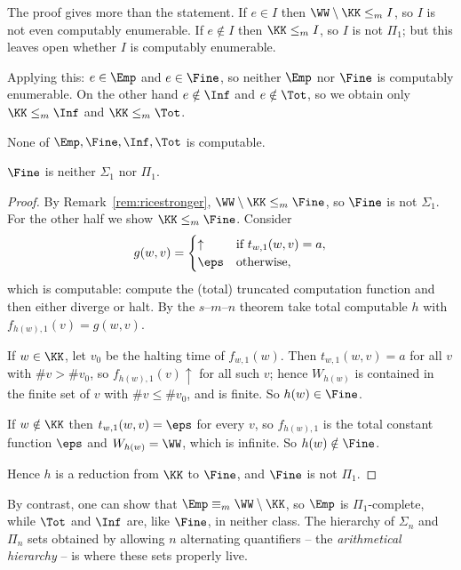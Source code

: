 \begin{remark}\label{rem:ricestronger}
	The proof gives more than the statement. If $e \in I$ then $\WW\setminus\KK \leq_m I$, so $I$ is not even computably enumerable. If $e \notin I$ then $\KK \leq_m I$, so $I$ is not $\Pi_1$; but this leaves open whether $I$ is computably enumerable.

	Applying this: $e \in \Emp$ and $e \in \Fine$, so neither $\Emp$ nor $\Fine$ is computably enumerable. On the other hand $e \notin\Inf$ and $e\notin\Tot$, so we obtain only $\KK\leq_m\Inf$ and $\KK\leq_m\Tot$.
\end{remark}

\begin{corollary}
	None of $\Emp, \Fine, \Inf, \Tot$ is computable.
\end{corollary}

\begin{theorem}
	$\Fine$ is neither $\Sigma_1$ nor $\Pi_1$.
\end{theorem}

\begin{proof}
	By Remark~\ref{rem:ricestronger}, $\WW\setminus\KK\leq_m\Fine$, so $\Fine$ is not $\Sigma_1$. For the other half we show $\KK\leq_m\Fine$. Consider
	$$g(w,v) = \begin{cases}\uparrow & \text{if } t_{w,1}(w,v) = a, \\ \eps & \text{otherwise},\end{cases}$$
	which is computable: compute the (total) truncated computation function and then either diverge or halt. By the $s$--$m$--$n$ theorem take total computable $h$ with $f_{h(w),1}(v) = g(w,v)$.

	If $w \in \KK$, let $v_0$ be the halting time of $f_{w,1}(w)$. Then $t_{w,1}(w,v) = a$ for all $v$ with $\#v > \#v_0$, so $f_{h(w),1}(v)\!\uparrow$ for all such $v$; hence $W_{h(w)}$ is contained in the finite set of $v$ with $\#v \leq \#v_0$, and is finite. So $h(w)\in\Fine$.

	If $w \notin\KK$ then $t_{w,1}(w,v) = \eps$ for every $v$, so $f_{h(w),1}$ is the total constant function $\eps$ and $W_{h(w)} = \WW$, which is infinite. So $h(w)\notin\Fine$.

	Hence $h$ is a reduction from $\KK$ to $\Fine$, and $\Fine$ is not $\Pi_1$.
\end{proof}

\begin{remark}
	By contrast, one can show that $\Emp \equiv_m \WW\setminus\KK$, so $\Emp$ is $\Pi_1$-complete, while $\Tot$ and $\Inf$ are, like $\Fine$, in neither class. The hierarchy of $\Sigma_n$ and $\Pi_n$ sets obtained by allowing $n$ alternating quantifiers -- the \emph{arithmetical hierarchy} -- is where these sets properly live.
\end{remark}

